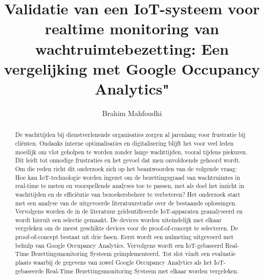 \documentclass{hogent-article}
\title{Validatie van een IoT-systeem voor realtime monitoring van wachtruimtebezetting: Een vergelijking met Google Occupancy Analytics"}
\author{Brahim Mahfoudhi}
\begin{document}
\begin{abstract}
De wachttijden bij dienstverlenende organisaties zorgen al jarenlang voor frustratie bij cliënten. Ondanks interne optimalisaties en digitalisering blijft het voor veel leden moeilijk om vlot geholpen te worden zonder lange wachttijden, vooral tijdens piekuren. Dit leidt tot onnodige frustraties en het gevoel dat men onvoldoende gehoord wordt. Om die reden richt dit onderzoek zich op het beantwoorden van de volgende vraag: Hoe kan IoT-technologie worden ingezet om de bezettingsgraad van wachtruimtes in real-time te meten en voorspellende analyses toe te passen, met als doel het inzicht in wachttijden en de efficiëntie van bezoekersbeheer te verbeteren? Het onderzoek start met een analyse van de uitgevoerde literatuurstudie over de bestaande oplossingen. Vervolgens worden de in de literatuur geïdentificeerde IoT-apparaten geanalyseerd en wordt hieruit een selectie gemaakt. De devices worden uiteindelijk met elkaar vergeleken om de meest geschikte devices voor de proof-of-concept te selecteren. De proof-of-concept bestaat uit drie fasen. Eerst wordt een nulmeting uitgevoerd met behulp van Google Occupancy Analytics. Vervolgens wordt een IoT-gebaseerd Real-Time Bezettingsmonitoring Systeem geïmplementeerd. Tot slot vindt een evaluatie plaats waarbij de gegevens van zowel Google Occupancy Analytics als het IoT-gebaseerde Real-Time Bezettingsmonitoring Systeem met elkaar worden vergeleken.


\end{abstract}

\tableofcontents



\printbibliography[heading=bibintoc]
\end{document}
